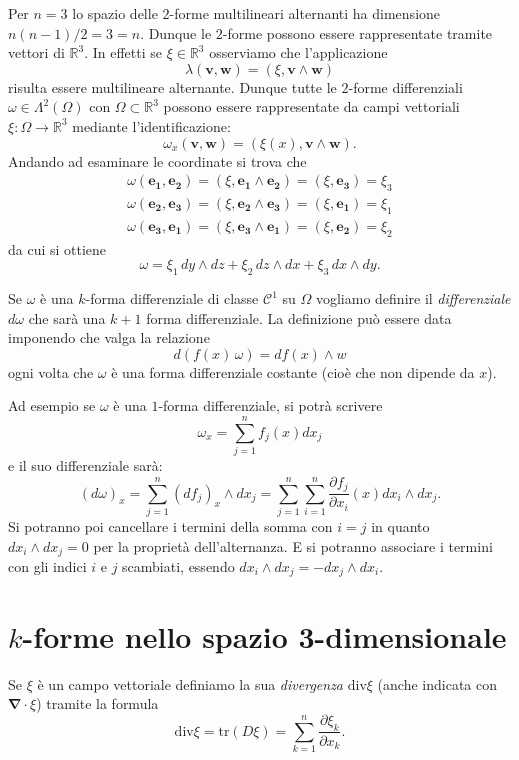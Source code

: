 \documentclass[italian,a4paper]{scrartcl}
\newcommand{\RR}{{\mathbb R}}
\renewcommand{\vec}{\mathbf}
\renewcommand{\div}{\mathrm{div}}
\newcommand{\vecnabla}{\mathbf{\nabla}}
\newcommand{\tr}{\mathrm{tr}}
\begin{document}
\begin{example}
Per $n=3$ lo spazio delle $2$-forme multilineari
alternanti ha dimensione
$n(n-1)/2=3=n$. Dunque le $2$-forme possono essere rappresentate
tramite vettori di $\RR^3$. In effetti se $\xi\in \RR^3$ osserviamo
che l'applicazione
\[
  \lambda(\vec v,\vec w) = (\xi, \vec v\wedge \vec w)
\]
risulta essere multilineare alternante. Dunque tutte le $2$-forme
differenziali $\omega \in \Lambda^2(\Omega)$ con $\Omega\subset \RR^3$
possono essere rappresentate da campi vettoriali $\xi\colon \Omega\to
\RR^3$ mediante l'identificazione:
\[
  \omega_x(\vec v, \vec w) = (\xi(x),\vec v \wedge \vec w).
\]
Andando ad esaminare le coordinate si trova che
\begin{align*}
  \omega(\vec{e_1},\vec{e_2}) = (\xi, \vec{e_1}\wedge\vec{e_2}) =
  (\xi,\vec{e_3}) = \xi_3\\
  \omega(\vec{e_2},\vec{e_3}) = (\xi, \vec{e_2}\wedge\vec{e_3}) =
  (\xi,\vec{e_1}) = \xi_1\\
  \omega(\vec{e_3},\vec{e_1}) = (\xi, \vec{e_3}\wedge\vec{e_1}) =
  (\xi,\vec{e_2}) = \xi_2
\end{align*}
da cui si ottiene
\[
 \omega = \xi_1\, dy\wedge dz + \xi_2\, dz\wedge dx + \xi_3\,
 dx\wedge dy.
\]
\end{example}


Se $\omega$ è una $k$-forma differenziale di classe $\mathcal C^1$ su
$\Omega$ vogliamo definire il \emph{differenziale} $d\omega$ che sarà
una $k+1$ forma differenziale. La definizione può essere data
imponendo che valga la relazione
\[
  d(f(x)\, \omega) = df(x) \wedge w
\]
ogni volta che $\omega$ è una forma differenziale costante (cioè che
non dipende da $x$).


Ad esempio se $\omega$ è una $1$-forma differenziale, si potrà
scrivere
\[
  \omega_x = \sum_{j=1}^n f_j(x) dx_j
\]
e il suo differenziale sarà:
\[
  (d\omega)_x = \sum_{j=1}^n (df_j)_x \wedge dx_j
  =\sum_{j=1}^n \sum_{i=1}^n \frac{\partial f_j}{\partial x_i}(x) dx_i
  \wedge dx_j.
\]
Si potranno poi cancellare i termini della somma con $i=j$ in quanto
$dx_i\wedge dx_j=0$ per la proprietà dell'alternanza. E si potranno
associare i termini con gli indici $i$ e $j$ scambiati, essendo $dx_i
\wedge dx_j = - dx_j \wedge dx_i$.

\section{$k$-forme nello spazio 3-dimensionale}

Se $\xi$ è un campo vettoriale definiamo la sua \emph{divergenza}
$\div \xi$ (anche indicata con $\vecnabla \cdot \xi$) tramite la formula
\[
  \div \xi = \tr( D\xi) = \sum_{k=1}^n \frac{\partial \xi_k}{\partial x_k}.
\]
\end{document}
